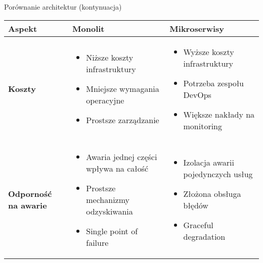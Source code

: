 \documentclass[aspectratio=169,xcolor=table]{beamer}
\begin{document}
\begin{frame}{Porównanie architektur (kontynuacja)}
  \begin{table}
    \footnotesize
    \begin{tabular}{>{\raggedright\arraybackslash}p{2.8cm}|>{\raggedright\arraybackslash}p{3.8cm}|>{\raggedright\arraybackslash}p{3.8cm}}
      \toprule
      \textbf{Aspekt} & \textbf{Monolit} & \textbf{Mikroserwisy} \\
      
      \midrule
      \textbf{Koszty} & \begin{itemize}[leftmargin=*]
        \item Niższe koszty infrastruktury
        \item Mniejsze wymagania operacyjne
        \item Prostsze zarządzanie
      \end{itemize} & \begin{itemize}[leftmargin=*]
        \item Wyższe koszty infrastruktury
        \item Potrzeba zespołu DevOps
        \item Większe nakłady na monitoring
      \end{itemize} \\
      \midrule
      \textbf{Odporność na awarie} & \begin{itemize}[leftmargin=*]
        \item Awaria jednej części wpływa na całość
        \item Prostsze mechanizmy odzyskiwania
        \item Single point of failure
      \end{itemize} & \begin{itemize}[leftmargin=*]
        \item Izolacja awarii pojedynczych usług
        \item Złożona obsługa błędów
        \item Graceful degradation
      \end{itemize} \\
      \bottomrule
    \end{tabular}
  \end{table}
\end{frame}
\end{document}
